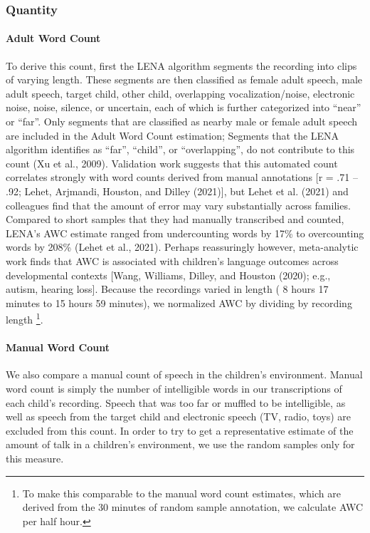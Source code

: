 \documentclass[
  man,floatsintext]{apa6}
\let\oldparagraph\paragraph
\renewcommand{\paragraph}[1]{\oldparagraph{#1}\mbox{}}
\begin{document}
\hypertarget{quantity}{%
\subsubsection{Quantity}\label{quantity}}

\hypertarget{adult-word-count}{%
\paragraph{Adult Word Count}\label{adult-word-count}}

To derive this count, first the LENA algorithm segments the recording into clips of varying length. These segments are then classified as female adult speech, male adult speech, target child, other child, overlapping vocalization/noise, electronic noise, noise, silence, or uncertain, each of which is further categorized into ``near'' or ``far''. Only segments that are classified as nearby male or female adult speech are included in the Adult Word Count estimation; Segments that the LENA algorithm identifies as ``far'', ``child'', or ``overlapping'', do not contribute to this count (Xu et al., 2009). Validation work suggests that this automated count correlates strongly with word counts derived from manual annotations {[}r = .71 -- .92; Lehet, Arjmandi, Houston, and Dilley (2021){]}, but Lehet et al. (2021) and colleagues find that the amount of error may vary substantially across families. Compared to short samples that they had manually transcribed and counted, LENA's AWC estimate ranged from undercounting words by 17\% to overcounting words by 208\% (Lehet et al., 2021). Perhaps reassuringly however, meta-analytic work finds that AWC is associated with children's language outcomes across developmental contexts {[}Wang, Williams, Dilley, and Houston (2020); e.g., autism, hearing loss{]}. Because the recordings varied in length ( 8 hours 17 minutes to 15 hours 59 minutes), we normalized AWC by dividing by recording length \footnote{To make this comparable to the manual word count estimates, which are derived from the 30 minutes of random sample annotation, we calculate AWC per half hour.}.

\hypertarget{manual-word-count}{%
\paragraph{Manual Word Count}\label{manual-word-count}}

We also compare a manual count of speech in the children's environment. Manual word count is simply the number of intelligible words in our transcriptions of each child's recording. Speech that was too far or muffled to be intelligible, as well as speech from the target child and electronic speech (TV, radio, toys) are excluded from this count. In order to try to get a representative estimate of the amount of talk in a children's environment, we use the random samples only for this measure.
\end{document}
